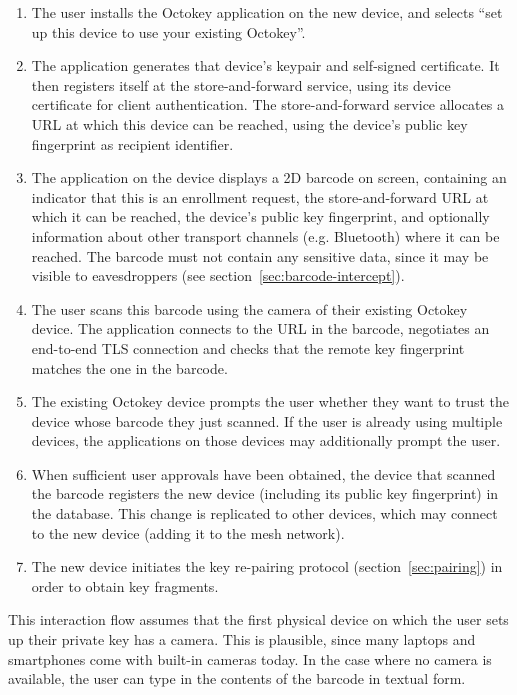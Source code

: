 \begin{enumerate}
\item The user installs the Octokey application on the new device, and selects ``set up this device
to use your existing Octokey''.
\item The application generates that device's keypair and self-signed certificate. It then registers
itself at the store-and-forward service, using its device certificate for client authentication. The
store-and-forward service allocates a URL at which this device can be reached, using the device's
public key fingerprint as recipient identifier.
\item The application on the device displays a 2D barcode on screen, containing an indicator that
this is an enrollment request, the store-and-forward URL at which it can be reached, the device's
public key fingerprint, and optionally information about other transport channels (e.g. Bluetooth)
where it can be reached. The barcode must not contain any sensitive data, since it may be visible to
eavesdroppers (see section~\ref{sec:barcode-intercept}).
\item The user scans this barcode using the camera of their existing Octokey device. The application
connects to the URL in the barcode, negotiates an end-to-end TLS connection and checks that the
remote key fingerprint matches the one in the barcode.
\item The existing Octokey device prompts the user whether they want to trust the device whose
barcode they just scanned. If the user is already using multiple devices, the applications on those
devices may additionally prompt the user.
\item When sufficient user approvals have been obtained, the device that scanned the barcode
registers the new device (including its public key fingerprint) in the database. This change is
replicated to other devices, which may connect to the new device (adding it to the mesh network).
\item The new device initiates the key re-pairing protocol (section~\ref{sec:pairing}) in order to
obtain key fragments.
\end{enumerate}

This interaction flow assumes that the first physical device on which the user sets up their private
key has a camera. This is plausible, since many laptops and smartphones come with built-in cameras
today. In the case where no camera is available, the user can type in the contents of the barcode in
textual form.

